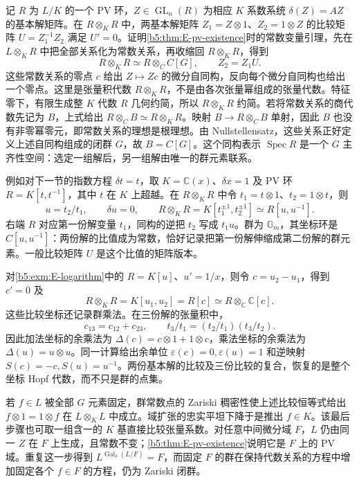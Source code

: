 \begin{proofsketch}
	记 \(R\) 为 \(L/K\) 的一个 PV 环，\(Z\in\operatorname{GL}_n(R)\) 为相应 \(K\) 系数系统 \(\delta(Z)=AZ\) 的基本解矩阵。在 \(R\otimes_KR\) 中，两基本解矩阵 \(Z_1=Z\otimes1\)、\(Z_2=1\otimes Z\) 的比较矩阵 \(U=Z_1^{-1}Z_2\) 满足 \(U'=0\)。证明\cref{b5:thm:E-pv-existence}时的常数变量引理，先在 \(L\otimes_KR\) 中把全部关系化为常数关系，再收缩回 \(R\otimes_KR\)，得到
	\[
		R\otimes_KR\simeq R\otimes_C C[G],\qquad Z_2=Z_1U.
	\]
	这些常数关系的零点 \(c\) 给出 \(Z\mapsto Zc\) 的微分自同构，反向每个微分自同构也给出一个零点。这里是张量积代数 \(R\otimes_KR\)，不是由各次张量幂组成的张量代数。特征零下，有限生成整 \(K\) 代数 \(R\) 几何约简，所以 \(R\otimes_KR\) 约简。若将常数关系的商代数先记为 \(B\)，上式给出 \(R\otimes_C B\simeq R\otimes_KR\)。映射 \(B\to R\otimes_C B\) 单射，因此 \(B\) 也没有非零幂零元，即常数关系的理想是根理想。由 Nullstellensatz，这些关系正好定义上述自同构组成的闭群 \(G\)，故 \(B=C[G]\)。这个同构表示 \(\operatorname{Spec}R\) 是一个 \(G\) 主齐性空间：选定一组解后，另一组解由唯一的群元素联系。

	例如对下一节的指数方程 \(\delta t=t\)，取 \(K=\mathbb C(x)\)、\(\delta x=1\) 及 PV 环 \(R=K[t,t^{-1}]\)，其中 \(t\) 在 \(K\) 上超越。在 \(R\otimes_KR\) 中令 \(t_1=t\otimes1\)、\(t_2=1\otimes t\)，则
	\[
		u=t_2/t_1,\qquad \delta u=0,\qquad R\otimes_KR=K[t_1^{\pm1},t_2^{\pm1}] \simeq R[u,u^{-1}].
	\]
	右端 \(R\) 对应第一份解变量 \(t_1\)，同构的逆把 \(t_2\) 写成 \(t_1u\)。群为 \(\mathbb G_m\)，其坐标环是 \(C[u,u^{-1}]\)：两份解的比值成为常数，恰好记录把第一份解伸缩成第二份解的群元素。一般比较矩阵 \(U\) 是这个比值的矩阵版本。

	对\cref{b5:exm:E-logarithm}中的 \(R=K[u]\)、\(u'=1/x\)，则令 \(c=u_2-u_1\)，得到 \(c'=0\) 及
	\[
		R\otimes_KR=K[u_1,u_2]=R[c]\simeq R\otimes_{\mathbb C}\mathbb C[c].
	\]
	这些比较坐标还记录群乘法。在三份解的张量积中，
	\[
		c_{13}=c_{12}+c_{23},\qquad t_3/t_1=(t_2/t_1)(t_3/t_2).
	\]
	因此加法坐标的余乘法为 \(\Delta(c)=c\otimes1+1\otimes c\)，乘法坐标的余乘法为 \(\Delta(u)=u\otimes u\)。同一计算给出余单位 \(\varepsilon(c)=0,\varepsilon(u)=1\) 和逆映射 \(S(c)=-c,S(u)=u^{-1}\)。两份基本解的比较及三份比较的复合，恢复的是整个坐标 Hopf 代数，而不只是群的点集。

	若 \(f\in L\) 被全部 \(G\) 元素固定，群常数点的 Zariski 稠密性使上述比较恒等式给出 \(f\otimes1=1\otimes f\) 在 \(L\otimes_KL\) 中成立。域扩张的忠实平坦下降于是推出 \(f\in K\)。该最后步骤也可取一组含一的 \(K\) 基直接比较张量系数。对任意中间微分域 \(F\)，\(L\) 仍由同一 \(Z\) 在 \(F\) 上生成，且常数不变；\cref{b5:thm:E-pv-existence}说明它是 \(F\) 上的 PV 域。重复这一步得到 \(L^{\operatorname{Gal}_\delta(L/F)}=F\)，而固定 \(F\) 的群在保持代数关系的方程中增加固定各个 \(f\in F\) 的方程，仍为 Zariski 闭群。


\end{proofsketch}
